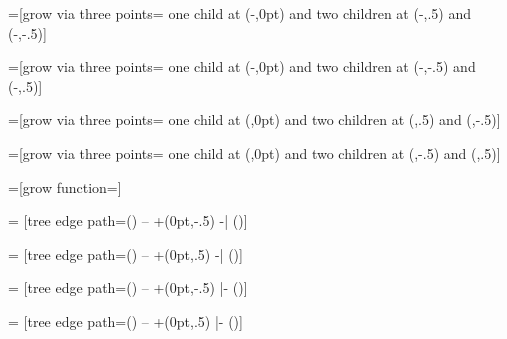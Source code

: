 =[grow via three points=%
  {one child at (-\tikzleveldistance,0pt) and 
   two children at (-\tikzleveldistance,.5\tikzsiblingdistance) and (-\tikzleveldistance,-.5\tikzsiblingdistance)}]

=[grow via three points=%
  {one child at (-\tikzleveldistance,0pt) and 
   two children at (-\tikzleveldistance,-.5\tikzsiblingdistance) and (-\tikzleveldistance,.5\tikzsiblingdistance)}]

=[grow via three points=%
  {one child at (\tikzleveldistance,0pt) and 
   two children at (\tikzleveldistance,.5\tikzsiblingdistance) and (\tikzleveldistance,-.5\tikzsiblingdistance)}]

=[grow via three points=%
  {one child at (\tikzleveldistance,0pt) and 
   two children at (\tikzleveldistance,-.5\tikzsiblingdistance) and (\tikzleveldistance,.5\tikzsiblingdistance)}]


%
%

=[grow function=\tikz@grow@circle]

\def\tikz@sibling@angle{20}

\def\tikz@grow@circle{%
  \c@pgf@counta=\tikz@sibling@angle\relax%
  \c@pgf@countb=\tikz@sibling@angle\relax%
  \divide\c@pgf@counta by2\relax%
  \multiply\c@pgf@countb by\tikznumberofcurrentchild\relax%
  \c@pgf@countc=-\c@pgf@counta\relax
  \multiply\c@pgf@countc by\tikznumberofchildren\relax%
  \advance\c@pgf@countc by-\c@pgf@counta\relax
  \advance\c@pgf@countc by\c@pgf@countb\relax
  \pgftransformrotate{\the\c@pgf@countc}%
  \pgftransformxshift{\the\tikzleveldistance}%
}


%
%

=
  [tree edge path={(\tikzparentnode\tikzparentanchor) -- +(0pt,-.5\tikzleveldistance)  -| (\tikzchildnode\tikzchildanchor)}]

=
  [tree edge path={(\tikzparentnode\tikzparentanchor) -- +(0pt,.5\tikzleveldistance)  -| (\tikzchildnode\tikzchildanchor)}]

=
  [tree edge path={(\tikzparentnode\tikzparentanchor) -- +(0pt,-.5\tikzleveldistance) |- (\tikzchildnode\tikzchildanchor)}]

=
  [tree edge path={(\tikzparentnode\tikzparentanchor) -- +(0pt,.5\tikzleveldistance) |- (\tikzchildnode\tikzchildanchor)}]


                                    
\endinput
